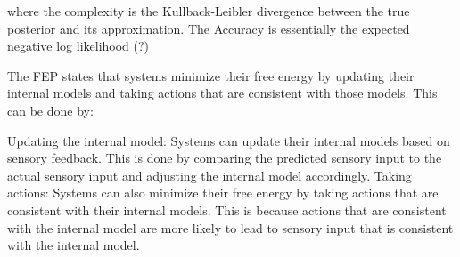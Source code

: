 where the complexity is the Kullback-Leibler divergence between the true posterior and its approximation. The Accuracy is essentially the expected negative log likelihood (?)  

The FEP states that systems minimize their free energy by updating their internal models and taking actions that are consistent with those models. This can be done by:

Updating the internal model: Systems can update their internal models based on sensory feedback. This is done by comparing the predicted sensory input to the actual sensory input and adjusting the internal model accordingly.
Taking actions: Systems can also minimize their free energy by taking actions that are consistent with their internal models. This is because actions that are consistent with the internal model are more likely to lead to sensory input that is consistent with the internal model.


